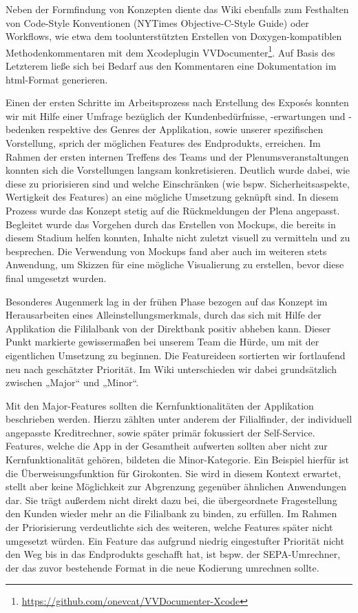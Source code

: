 	Neben der Formfindung von Konzepten diente das Wiki ebenfalls zum Festhalten von Code-Style Konventionen (NYTimes Objective-C-Style Guide) oder Workflows, wie etwa dem toolunterstützten Erstellen von Doxygen-kompatiblen Methodenkommentaren mit dem Xcodeplugin VVDocumenter\footnote{\url{https://github.com/onevcat/VVDocumenter-Xcode}}. Auf Basis des Letzterem ließe sich bei Bedarf aus den Kommentaren eine Dokumentation im html-Format generieren. 

	Einen der ersten Schritte im Arbeitsprozess nach Erstellung des Exposés konnten wir mit Hilfe einer Umfrage bezüglich der Kundenbedürfnisse, -erwartungen und -bedenken respektive des Genres der Applikation, sowie unserer spezifischen Vorstellung, sprich der möglichen Features des Endprodukts, erreichen. Im Rahmen der ersten internen Treffens des Teams und der Plenumsveranstaltungen konnten sich die Vorstellungen langsam konkretisieren. Deutlich wurde dabei, wie diese zu priorisieren sind und welche Einschränken (wie bspw. Sicherheitsaspekte, Wertigkeit des Features) an eine mögliche Umsetzung geknüpft sind. In diesem Prozess wurde das Konzept stetig auf die Rückmeldungen der Plena angepasst. Begleitet wurde das Vorgehen durch das Erstellen von Mockups, die bereits in diesem Stadium helfen konnten, Inhalte nicht zuletzt visuell zu vermitteln und zu besprechen. Die Verwendung von Mockups fand aber auch im weiteren stets Anwendung, um Skizzen für eine mögliche Visualierung zu erstellen, bevor diese final umgesetzt wurden.

	Besonderes Augenmerk lag in der frühen Phase bezogen auf das Konzept im Herausarbeiten eines Alleinstellungsmerkmals, durch das sich mit Hilfe der Applikation die Fililalbank von der Direktbank positiv abheben kann. Dieser Punkt markierte gewissermaßen bei unserem Team die Hürde, um mit der eigentlichen Umsetzung zu beginnen. Die Featureideen sortierten wir fortlaufend neu nach geschätzter Priorität. Im Wiki unterschieden wir dabei grundsätzlich zwischen „Major“ und „Minor“.  
	
	Mit den Major-Features sollten die Kernfunktionalitäten der Applikation beschrieben werden. Hierzu zählten unter anderem der Filialfinder, der individuell angepasste Kreditrechner, sowie später primär fokussiert der Self-Service. Features, welche die App in der Gesamtheit aufwerten sollten aber nicht zur Kernfunktionalität gehören, bildeten die Minor-Kategorie. Ein Beispiel hierfür ist die Überweisungsfunktion für Girokonten. Sie wird in diesem Kontext erwartet, stellt aber keine Möglichkeit zur Abgrenzung gegenüber ähnlichen Anwendungen dar. Sie trägt außerdem nicht direkt dazu bei, die übergeordnete Fragestellung den Kunden wieder mehr an die Filialbank zu binden, zu erfüllen. Im Rahmen der Priorisierung verdeutlichte sich des weiteren, welche Features später nicht umgesetzt würden. Ein Feature das aufgrund niedrig eingestufter Priorität nicht den Weg bis in das Endprodukts geschafft hat, ist bspw. der SEPA-Umrechner, der das zuvor bestehende Format in die neue Kodierung umrechnen sollte. 
	
